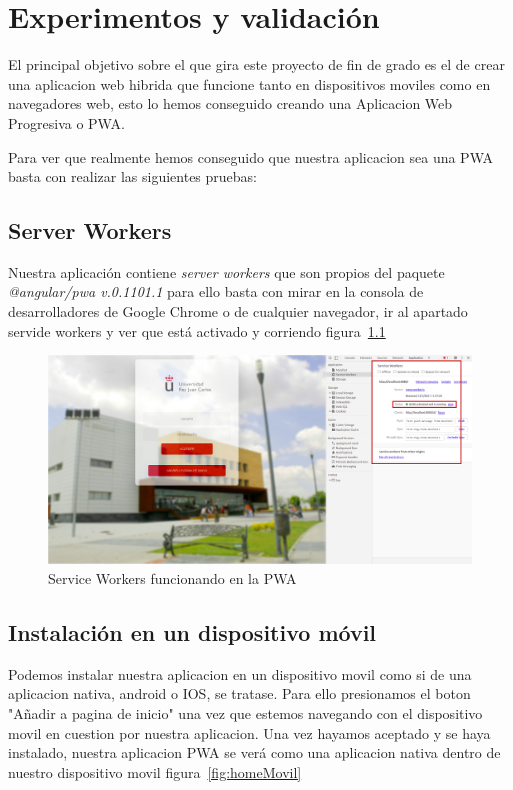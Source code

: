 \documentclass[a4paper, 12pt]{book}
\begin{document}

\cleardoublepage
\chapter{Experimentos y validación}

El principal objetivo sobre el que gira este proyecto de fin de grado es el de crear una aplicacion web hibrida que funcione tanto en dispositivos moviles como en navegadores web, esto lo hemos conseguido creando una Aplicacion Web Progresiva o PWA. 

Para ver que realmente hemos conseguido que nuestra aplicacion sea una PWA basta con realizar las siguientes pruebas: 

\section{Server Workers}
Nuestra aplicación contiene \textit{server workers} que son propios del paquete \textit{@angular/pwa v.0.1101.1} para ello basta con mirar en la consola de desarrolladores de Google Chrome o de cualquier navegador, ir al apartado servide workers y ver que está activado y corriendo figura~\ref{fig:principalWorker}
	
	\begin{figure}[H]
  	\centering
  	\includegraphics[width=16cm, keepaspectratio]{img/principalWorker.png}
  	\caption{Service Workers funcionando en la PWA}\label{fig:principalWorker}
	\end{figure}
	  
\section{Instalación en un dispositivo móvil}
Podemos instalar nuestra aplicacion en un dispositivo movil como si de una aplicacion nativa, android o IOS, se tratase. Para ello presionamos el boton "Añadir a pagina de inicio" una vez que estemos navegando con el dispositivo movil en cuestion por nuestra aplicacion.
	Una vez hayamos aceptado y se haya instalado, nuestra aplicacion PWA se verá como una aplicacion nativa dentro de nuestro dispositivo movil figura~\ref{fig:homeMovil} 
 
\end{document}
